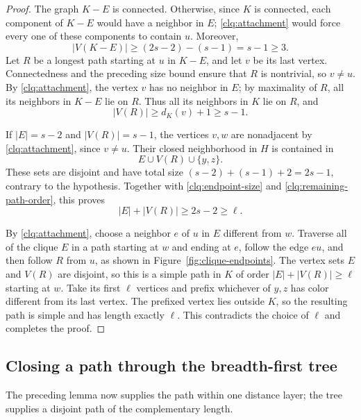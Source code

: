 \begin{proof}
The graph $K-E$ is connected.  Otherwise, since $K$ is connected,
each component of $K-E$ would have a neighbor in $E$;
\eqref{clq:attachment} would force every one of these components
to contain $u$.  Moreover,
\[
 |V(K-E)|\ge (2s-2)-(s-1)=s-1\ge3.
\]
Let $R$ be a longest path starting at $u$ in $K-E$, and let $v$
be its last vertex.  Connectedness and the preceding size bound
ensure that $R$ is nontrivial, so $v\ne u$.
By \eqref{clq:attachment}, the vertex $v$ has no neighbor in $E$;
by maximality of $R$, all its neighbors in $K-E$ lie on $R$.
Thus all its neighbors in $K$ lie on $R$, and
\begin{equation}\label{clq:remaining-path-order}
 |V(R)|\ge d_K(v)+1\ge s-1.
\end{equation}

If $|E|=s-2$ and $|V(R)|=s-1$, the vertices $v,w$ are
nonadjacent by \eqref{clq:attachment}, since $v\ne u$.
Their closed neighborhood in $H$ is contained in
\[
 E\cup V(R)\cup\{y,z\}.
\]
These sets are disjoint and have total size
$(s-2)+(s-1)+2=2s-1$, contrary to the hypothesis.
Together with \eqref{clq:endpoint-size} and
\eqref{clq:remaining-path-order}, this proves
\[
 |E|+|V(R)|\ge2s-2\ge\ell.
\]

By \eqref{clq:attachment}, choose a neighbor $e$ of $u$ in $E$
different from $w$.  Traverse all of the clique $E$ in a path
starting at $w$ and ending at $e$, follow the edge $eu$, and then
follow $R$ from $u$, as shown in Figure~\ref{fig:clique-endpoints}.
The vertex sets $E$ and $V(R)$ are disjoint,
so this is a simple path in $K$ of order
$|E|+|V(R)|\ge\ell$ starting at $w$.
Take its first $\ell$ vertices and prefix whichever of $y,z$ has
color different from its last vertex.  The prefixed vertex lies
outside $K$, so the resulting path is simple and has length exactly
$\ell$.  This contradicts the choice of $\ell$ and completes the
proof.
\end{proof}

\subsection{Closing a path through the breadth-first tree}

The preceding lemma now supplies the path within one distance layer;
the tree supplies a disjoint path of the complementary length.

